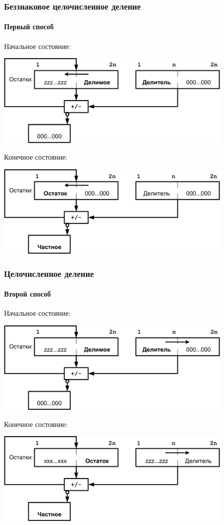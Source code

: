 \begin{frame}
    \frametitle{Беззнаковое целочисленное деление}
    \framesubtitle{Первый способ}

     {
        Начальное состояние:
        \begin{center}
            \includegraphics[width=0.85\textwidth]{fig/ibegin}
        \end{center}
    }
     {
        Конечное состояние:
        \begin{center}
            \includegraphics[width=0.85\textwidth]{fig/iend}
        \end{center}
    }
\end{frame}

\begin{frame}
    \frametitle{Целочисленное деление}
    \framesubtitle{Второй способ}

     {
        Начальное состояние:
        \begin{center}
            \includegraphics[width=0.85\textwidth]{fig/iibegin}
        \end{center}
    }
     {
        Конечное состояние:
        \begin{center}
            \includegraphics[width=0.85\textwidth]{fig/iiend}
        \end{center}
    }
\end{frame}


